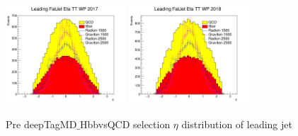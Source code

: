 \begin{figure}[!htb]
	\includegraphics[width=0.4\textwidth]{Figures/eta0TT_17_deepTagMD_HbbvsQCD.png}
	\includegraphics[width=0.4\textwidth]{Figures/eta0TT_18_deepTagMD_HbbvsQCD.png}
	\caption{Pre deepTagMD$\_$HbbvsQCD selection $\eta$ distribution of leading jet}
	\label{fig:preEtaleadBY}
\end{figure}
